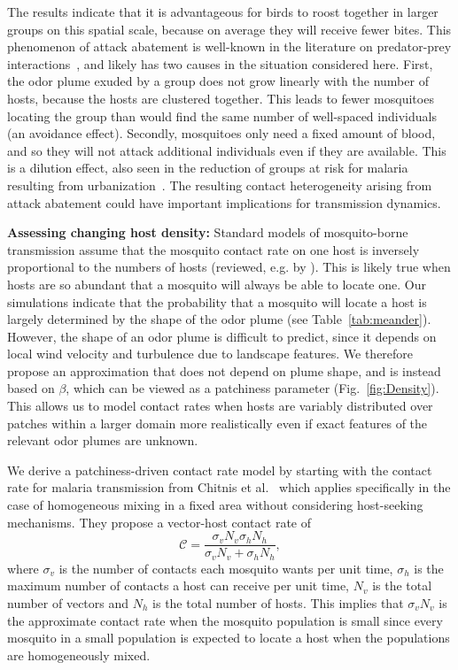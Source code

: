 \documentclass[10pt]{article}
\begin{document}
The results indicate that it is advantageous for birds to roost together in larger groups on this spatial scale, because on average they will receive fewer bites. This phenomenon of attack abatement is well-known in the literature on predator-prey interactions~\cite{Turner1986}, and likely has two causes in the situation considered here. First, the odor plume exuded by a group does not grow linearly with the number of hosts, because the hosts are clustered together. This leads to fewer mosquitoes locating the group than would find the same number of well-spaced individuals (an avoidance effect). Secondly, mosquitoes only need a fixed amount of blood, and so they will not attack additional individuals even if they are available. This is a dilution effect, also seen in the reduction of groups at risk for malaria resulting from urbanization~\cite{HayEtAl2005}. 
The resulting contact heterogeneity arising from attack abatement could have important
implications for transmission dynamics. 

%

\textbf{Assessing changing host density: } Standard models of mosquito-borne transmission assume that the mosquito contact rate on one host is inversely proportional to the numbers of hosts (reviewed, e.g. by \cite{Wonham2006}). This is likely true when hosts are so abundant that a mosquito will always be able to locate one. Our simulations indicate that the probability that a mosquito will locate a host is largely determined by the shape of the odor plume (see Table~\ref{tab:meander}). However, the shape of an odor plume is difficult to predict, since it depends on local wind velocity and turbulence due to landscape features. We therefore propose an approximation that does not depend on plume shape, and is instead based on $\beta$, which can be viewed as a patchiness parameter (Fig.~\ref{fig:Density}).
This allows us to model contact rates when hosts are variably distributed over patches within a larger domain more realistically even if exact features of the relevant odor plumes are unknown.

We derive a patchiness-driven contact rate model by starting with the contact rate for malaria transmission from
Chitnis et al.~\cite{Chitnis2006} which applies specifically in the case of homogeneous mixing in a fixed area without considering host-seeking mechanisms.   They propose a vector-host contact rate of
\begin{equation*}
	\mathcal{C} = \frac{\sigma_v N_v\sigma_h N_h}{\sigma_v N_v + \sigma_h N_h},
\end{equation*}
where $\sigma_v$ is the number of contacts each mosquito wants per unit time, $\sigma_h$ is the maximum number of contacts a host can receive per unit time, $N_v$ is the total number of vectors and $N_h$ is the total number of hosts. This implies that $\sigma_v N_v$ is the approximate contact rate when the mosquito population is small since every mosquito in a small population is expected to locate a host when the populations are homogeneously mixed.
\end{document}
